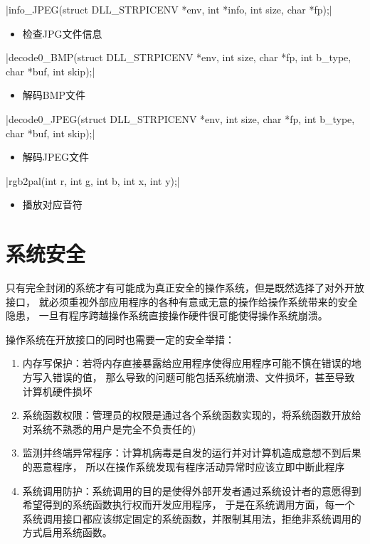    \csingle|info_JPEG(struct DLL_STRPICENV *env, int *info, int size, char *fp);|
    \begin{itemize}
    \item 检查JPG文件信息
    \end{itemize}

    \csingle|decode0_BMP(struct DLL_STRPICENV *env, int size, char *fp, int b_type, char *buf, int skip);|
    \begin{itemize}
    \item 解码BMP文件
    \end{itemize}

    \csingle|decode0_JPEG(struct DLL_STRPICENV *env, int size, char *fp, int b_type, char *buf, int skip);|
    \begin{itemize}
    \item 解码JPEG文件
    \end{itemize}

    \csingle|rgb2pal(int r, int g, int b, int x, int y);|
    \begin{itemize}
    \item 播放对应音符
    \end{itemize}

\section{系统安全}

只有完全封闭的系统才有可能成为真正安全的操作系统，但是既然选择了对外开放接口，
就必须重视外部应用程序的各种有意或无意的操作给操作系统带来的安全隐患，
一旦有程序跨越操作系统直接操作硬件很可能使得操作系统崩溃。

操作系统在开放接口的同时也需要一定的安全举措：
\begin{enumerate}
    \item 内存写保护：若将内存直接暴露给应用程序使得应用程序可能不慎在错误的地方写入错误的值，
    那么导致的问题可能包括系统崩溃、文件损坏，甚至导致计算机硬件损坏
    \item 系统函数权限：管理员的权限是通过各个系统函数实现的，将系统函数开放给对系统不熟悉的用户是完全不负责任的)
    \item 监测并终端异常程序：计算机病毒是自发的运行并对计算机造成意想不到后果的恶意程序，
    所以在操作系统发现有程序活动异常时应该立即中断此程序
    \item 系统调用防护：系统调用的目的是使得外部开发者通过系统设计者的意愿得到希望得到的系统函数执行权而开发应用程序，
    于是在系统调用方面，每一个系统调用接口都应该绑定固定的系统函数，并限制其用法，拒绝非系统调用的方式启用系统函数。
\end{enumerate}